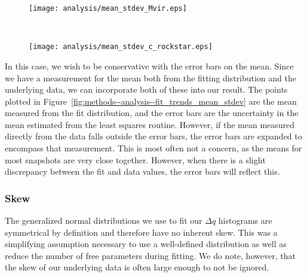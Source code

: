 \begin{figure*}[t]
	\centering
	\begin{subfigure}{}
		\texttt{[image: analysis/mean\_stdev\_Mvir.eps]}
	\end{subfigure}
	\\
	\begin{subfigure}{}
		\texttt{[image: analysis/mean\_stdev\_c\_rockstar.eps]}
	\end{subfigure}
	\caption[Mean, standard deviation, and rms as functions of redshift for generalized normal fits]{\footnotesize Mean, standard deviation, and rms as functions of redshift for $\Delta M_{\mathrm{vir}}$ (\textit{top}) and $\Delta c$ (\textit{bottom}).  The mean is plotted as blue points, $\mu \pm \sigma$ is plotted as the black dashed curves, and rms values are plotted as a green dotted curve.  The red dashed line is a linear fit to the mean.}
	\label{fig:methods--analysis--fit_trends_mean_stdev}
\end{figure*}

In this case, we wish to be conservative with the error bars on the mean.  Since we have a measurement for the mean both from the fitting distribution and the underlying data, we can incorporate both of these into our result.  The points plotted in Figure~\ref{fig:methods--analysis--fit_trends_mean_stdev} are the mean measured from the fit distribution, and the error bars are the uncertainty in the mean estimated from the least squares routine.  However, if the mean measured directly from the data falls outside the error bars, the error bars are expanded to encompass that measurement.  This is most often not a concern, as the means for most snapshots are very close together.  However, when there is a slight discrepancy between the fit and data values, the error bars will reflect this.



\subsubsection{Skew}
\label{subsubsec:analysis--redshift_trends--skew}


The generalized normal distributions we use to fit our $\Delta q$ histograms are symmetrical by definition and therefore have no inherent skew.  This was a simplifying assumption necessary to use a well-defined distribution as well as reduce the number of free parameters during fitting.  We do note, however, that the skew of our underlying data is often large enough to not be ignored.

